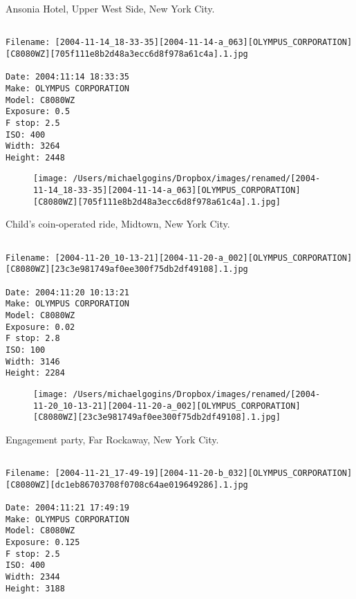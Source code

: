 \clearpage
\onecolumn
\noindent Ansonia Hotel, Upper West Side, New York City.
\noindent
\begin{lstlisting}

Filename: [2004-11-14_18-33-35][2004-11-14-a_063][OLYMPUS_CORPORATION][C8080WZ][705f111e8b2d48a3ecc6d8f978a61c4a].1.jpg

Date: 2004:11:14 18:33:35
Make: OLYMPUS CORPORATION
Model: C8080WZ
Exposure: 0.5
F stop: 2.5
ISO: 400
Width: 3264
Height: 2448
\end{lstlisting}
\clearpage

\begin{figure}
\texttt{[image: /Users/michaelgogins/Dropbox/images/renamed/[2004-11-14\_18-33-35][2004-11-14-a\_063][OLYMPUS\_CORPORATION][C8080WZ][705f111e8b2d48a3ecc6d8f978a61c4a].1.jpg]}
\end{figure}
    
\clearpage
\onecolumn
\noindent Child's coin-operated ride, Midtown, New York City.
\noindent
\begin{lstlisting}

Filename: [2004-11-20_10-13-21][2004-11-20-a_002][OLYMPUS_CORPORATION][C8080WZ][23c3e981749af0ee300f75db2df49108].1.jpg

Date: 2004:11:20 10:13:21
Make: OLYMPUS CORPORATION
Model: C8080WZ
Exposure: 0.02
F stop: 2.8
ISO: 100
Width: 3146
Height: 2284
\end{lstlisting}
\clearpage

\begin{figure}
\texttt{[image: /Users/michaelgogins/Dropbox/images/renamed/[2004-11-20\_10-13-21][2004-11-20-a\_002][OLYMPUS\_CORPORATION][C8080WZ][23c3e981749af0ee300f75db2df49108].1.jpg]}
\end{figure}
    
\clearpage
\onecolumn
\noindent Engagement party, Far Rockaway, New York City.
\noindent
\begin{lstlisting}

Filename: [2004-11-21_17-49-19][2004-11-20-b_032][OLYMPUS_CORPORATION][C8080WZ][dc1eb86703708f0708c64ae019649286].1.jpg

Date: 2004:11:21 17:49:19
Make: OLYMPUS CORPORATION
Model: C8080WZ
Exposure: 0.125
F stop: 2.5
ISO: 400
Width: 2344
Height: 3188
\end{lstlisting}
\clearpage

